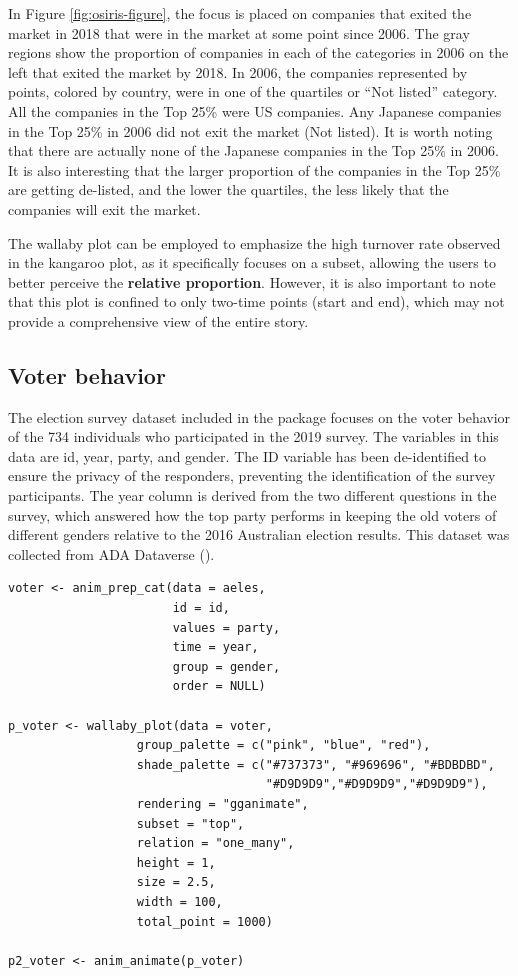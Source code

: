 In Figure \ref{fig:osiris-figure}, the focus is placed on companies that exited the market in 2018 that were in the market at some point since 2006. The gray regions show the proportion of companies in each of the categories in 2006 on the left that exited the market by 2018. In 2006, the companies represented by points, colored by country, were in one of the quartiles or ``Not listed'' category. All the companies in the Top 25\% were US companies. Any Japanese companies in the Top 25\% in 2006 did not exit the market (Not listed). It is worth noting that there are actually none of the Japanese companies in the Top 25\% in 2006. It is also interesting that the larger proportion of the companies in the Top 25\% are getting de-listed, and the lower the quartiles, the less likely that the companies will exit the market.

The wallaby plot can be employed to emphasize the high turnover rate observed in the kangaroo plot, as it specifically focuses on a subset, allowing the users to better perceive the \textbf{relative proportion}. However, it is also important to note that this plot is confined to only two-time points (start and end), which may not provide a comprehensive view of the entire story.

\subsection{Voter behavior}\label{voter-behavior}

The election survey dataset included in the  package focuses on the voter behavior of the 734 individuals who participated in the 2019 survey. The variables in this data are id, year, party, and gender. The ID variable has been de-identified to ensure the privacy of the responders, preventing the identification of the survey participants. The year column is derived from the two different questions in the survey, which answered how the top party performs in keeping the old voters of different genders relative to the 2016 Australian election results. This dataset was collected from ADA Dataverse (\citet{aeles}).

\begin{verbatim}
voter <- anim_prep_cat(data = aeles,
                       id = id,
                       values = party,
                       time = year,
                       group = gender,
                       order = NULL)

p_voter <- wallaby_plot(data = voter,
                  group_palette = c("pink", "blue", "red"),
                  shade_palette = c("#737373", "#969696", "#BDBDBD",
                                    "#D9D9D9","#D9D9D9","#D9D9D9"),
                  rendering = "gganimate",
                  subset = "top",
                  relation = "one_many",
                  height = 1,
                  size = 2.5,
                  width = 100,
                  total_point = 1000)

p2_voter <- anim_animate(p_voter)
\end{verbatim}

